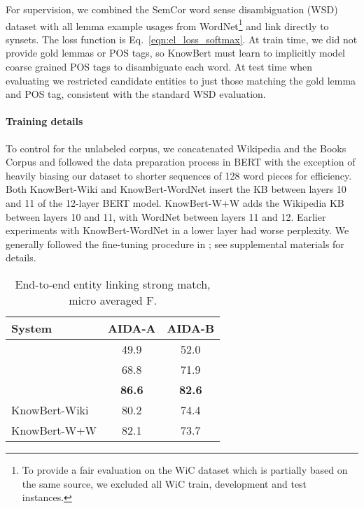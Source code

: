 \documentclass[11pt,a4paper]{article}
\newcommand{\reword}[2]{\textcolor{orange}{#2\sout{#1}}}
\renewcommand{\reword}[2]{#2}
\newcommand{\KBS}[0]{KnowBert }
\newcommand{\KWIKI}[0]{KnowBert-Wiki}
\newcommand{\KWANDW}[0]{KnowBert-W+W}
\newcommand{\KWIKIS}[0]{KnowBert-Wiki }
\newcommand{\KWORDNETS}[0]{KnowBert-WordNet }
\newcommand{\KWANDWS}[0]{KnowBert-W+W }
\newcommand{\BBS}[0]{BERT }
\begin{document}
For supervision, we combined the SemCor word sense disambiguation (WSD) dataset \cite{Miller1994UsingAS} with all lemma example usages from WordNet\footnote{To provide a fair evaluation on the WiC dataset which is partially based on the same source, we excluded all WiC train, development and test instances.} and link directly to synsets.
The loss function is Eq.~\ref{eqn:el_loss_softmax}.
At train time, we did not provide gold lemmas or POS tags, so \KBS must learn to implicitly model coarse grained POS tags to disambiguate each word.
At test time when evaluating we restricted \reword{the available }{}candidate entities to just those matching the gold lemma and POS tag, consistent with the standard WSD evaluation.


\paragraph{Training details}
To control for the unlabeled corpus, we concatenated Wikipedia and the Books Corpus \cite{Zhu2015AligningBA} and followed the data preparation process in BERT with the exception of heavily biasing our dataset to shorter sequences of 128 word pieces for efficiency.
Both \KWIKIS and \KWORDNETS insert the KB between layers 10 and 11 of the 12-layer \BBS model.  \KWANDWS adds the Wikipedia KB between layers 10 and 11, with WordNet between layers 11 and 12.
Earlier experiments with \KWORDNETS in a lower layer had worse perplexity.
We generally followed the fine-tuning procedure in \citet{Devlin2018}; see supplemental materials for details.



\begin{table}
\centering
\begin{tabular}{l c c}
\toprule
System & AIDA-A & AIDA-B \\
 \midrule
 \citet{Daiber2013ImprovingEA} & 49.9 & 52.0 \\
 \citet{Hoffart2011RobustDO} & 68.8 & 71.9 \\
 \citet{Kolitsas2018EndtoEndNE} & \textbf{86.6} & \textbf{82.6} \\
\KWIKI & 80.2 & 74.4\\
 \KWANDW & 82.1 & 73.7 \\
\bottomrule
\end{tabular}
\caption{End-to-end entity linking strong match, micro averaged F.}
\label{tab:el}

\end{table}
\end{document}
